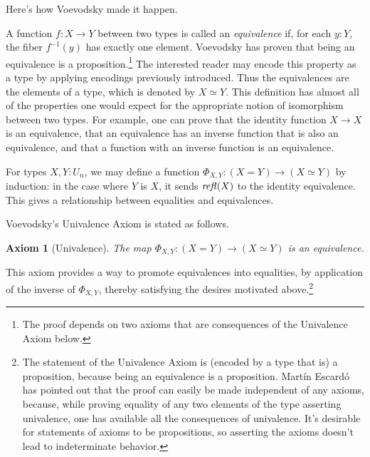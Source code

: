\documentclass[letter,12pt]{amsart}
\newtheorem{axiom}[theorem]{Axiom}
\theoremstyle{definition}
\theoremstyle{remark}
\numberwithin{equation}{section}
\newcommand{\refl}{\mathop{{\it refl}}}
\newcommand{\weq}{\simeq}
\begin{document}
Here's how Voevodsky made it happen.

A function $f : X \to Y$ between two types is called an {\em equivalence} if, for each $y:Y$, the fiber $f^{-1}(y)$ has exactly one element.  Voevodsky
has proven that being an equivalence is a proposition.\footnote{The proof depends on two axioms that are consequences of the Univalence
  Axiom below.}  The interested reader may encode this property as a type by applying encodings
previously introduced.  Thus the equivalences are the elements of a type, which is denoted by $X \weq Y$.  This definition has almost all of the
properties one would expect for the appropriate notion of isomorphism between two types.  For example, one can prove that the identity function
$X \to X$ is an equivalence, that an equivalence has an inverse function that is also an equivalence, and that a function with an inverse
function is an equivalence.

For types $X,Y:U_n$, we may define a function $ \Phi_{X,Y} : (X=Y) \to (X \weq Y)$ by induction: in the case where $Y$ is $X$, it sends
$\refl(X)$ to the identity equivalence.  This gives a relationship between equalities and equivalences.

Voevodsky's Univalence Axiom is stated as follows.

\begin{axiom}[Univalence]
  The map $ \Phi_{X,Y} : (X=Y) \to (X \weq Y)$ is an equivalence.
\end{axiom}

This axiom provides a way to promote equivalences into equalities, by application of the inverse of $ \Phi_{X,Y} $, thereby satisfying the
desires motivated above.\footnote{The statement of the Univalence Axiom is (encoded by a type that is) a proposition, because being an equivalence
  is a proposition.  Mart\'in Escard\'o has pointed out that the proof can easily be made independent of any axioms, because, while proving
  equality of any two elements of the type asserting univalence, one has available all the consequences of univalence.  It's desirable for
  statements of axioms to be propositions, so asserting the axioms doesn't lead to indeterminate behavior.}
\end{document}
